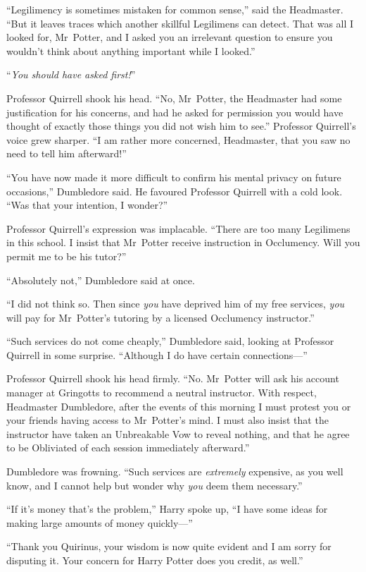 “Legilimency is sometimes mistaken for common sense,” said the Headmaster. “But it leaves traces which another skillful Legilimens can detect. That was all I looked for, Mr~Potter, and I asked you an irrelevant question to ensure you wouldn’t think about anything important while I looked.”

“\emph{You should have asked first!}”

Professor Quirrell shook his head. “No, Mr~Potter, the Headmaster had some justification for his concerns, and had he asked for permission you would have thought of exactly those things you did not wish him to see.” Professor Quirrell’s voice grew sharper. “I am rather more concerned, Headmaster, that you saw no need to tell him afterward!”

“You have now made it more difficult to confirm his mental privacy on future occasions,” Dumbledore said. He favoured Professor Quirrell with a cold look. “Was that your intention, I wonder?”

Professor Quirrell’s expression was implacable. “There are too many Legilimens in this school. I insist that Mr~Potter receive instruction in Occlumency. Will you permit me to be his tutor?”

“Absolutely not,” Dumbledore said at once.

“I did not think so. Then since \emph{you} have deprived him of my free services, \emph{you} will pay for Mr~Potter’s tutoring by a licensed Occlumency instructor.”

“Such services do not come cheaply,” Dumbledore said, looking at Professor Quirrell in some surprise. “Although I do have certain connections—”

Professor Quirrell shook his head firmly. “No. Mr~Potter will ask his account manager at Gringotts to recommend a neutral instructor. With respect, Headmaster Dumbledore, after the events of this morning I must protest you or your friends having access to Mr~Potter’s mind. I must also insist that the instructor have taken an Unbreakable Vow to reveal nothing, and that he agree to be Obliviated of each session immediately afterward.”

Dumbledore was frowning. “Such services are \emph{extremely} expensive, as you well know, and I cannot help but wonder why \emph{you} deem them necessary.”

“If it’s money that’s the problem,” Harry spoke up, “I have some ideas for making large amounts of money quickly—”

“Thank you Quirinus, your wisdom is now quite evident and I am sorry for disputing it. Your concern for Harry Potter does you credit, as well.”

